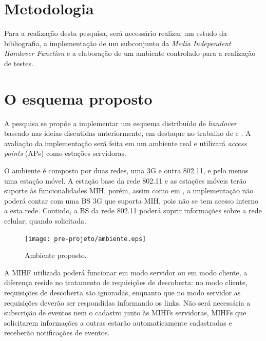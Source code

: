 \documentclass[12pt]{article}
\begin{document}
\section{Metodologia} \label{sec:metodologia} %

Para a realização desta pesquisa, será necessário realizar um estudo da 
bibliografia, a implementação de um subconjunto da \textit{Media Independent 
Handover Function} e a elaboração de um ambiente controlado para a realização 
de testes.  




\section{O esquema proposto}

A pesquisa se propõe a implementar um esquema distribuído de \textit{handover} 
baseado nas ideias discutidas anteriormente, em destaque no trabalho de 
\cite{kimhun:2010} e \cite{tawil:2008}. A avaliação da implementação será 
feita em um ambiente real e utilizará \textit{access points} (APs) como 
estações servidoras.

O ambiente é composto por duas redes, uma 3G e outra 802.11, e pelo menos uma 
estação móvel. A estação base da rede 802.11 e as estações móveis terão 
suporte às funcionalidades MIH, porém, assim como em \cite{taniuchi:2009}, a 
implementação não poderá contar com uma BS 3G que suporta MIH, pois não se tem 
acesso interno a esta rede.  Contudo, a BS da rede 802.11 poderá suprir 
informações sobre a rede celular, quando solicitada.

\begin{figure}[ht]
	\centering
	\texttt{[image: pre-projeto/ambiente.eps]}
	\caption{Ambiente proposto.}
	\label{fig:ambiente}
\end{figure}

A MIHF utilizada poderá funcionar em modo servidor ou em modo cliente, a 
diferença reside no tratamento de requisições de descoberta: no modo cliente, 
requisições de descoberta são ignoradas, enquanto que no modo servidor as 
requisições deverão ser respondidas informando os links. Não será necessária a 
subscrição de eventos nem o cadastro junto às MIHFs servidoras, MIHFs que 
solicitarem informações a outras estarão automaticamente cadastradas e 
receberão notificações de eventos.
\end{document}
